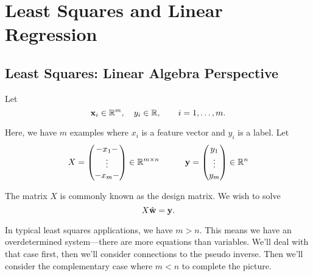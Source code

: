 \chapter{Least Squares and Linear Regression}
\section{Least Squares: Linear Algebra Perspective} 
Let
$$
{ \bf x}_i \in \mathbb{R}^m,\quad y_i \in \mathbb{R}, \quad\quad i=1,\ldots, m.
$$

\vspace{1em}
Here, we have $m$ examples where $x_i$ is a feature vector and $y_i$ is a label. 
Let
$$
X = 
\begin{pmatrix}
    -x_1-\\
    \vdots\\
    -x_m-
\end{pmatrix}\in \mathbb{R}^{m\times n}
\quad \quad \quad
{\bf y} = 
\begin{pmatrix}
    y_1\\
    \vdots\\
    y_m
\end{pmatrix} \in \mathbb{R}^{n}
$$

The matrix $X$ is commonly known as the design matrix. We wish to solve 
\begin{equation} \label{eq:least-squares}
X\hat {{ \bf w}} = {\bf y}. 
\end{equation}

In typical least squares applications, we have $m > n$. This means we have an overdetermined system---there are more equations than variables. We'll deal with that case first, then we'll consider connections to the pseudo inverse. Then we'll consider the complementary case where $m<n$ to complete the picture. 


